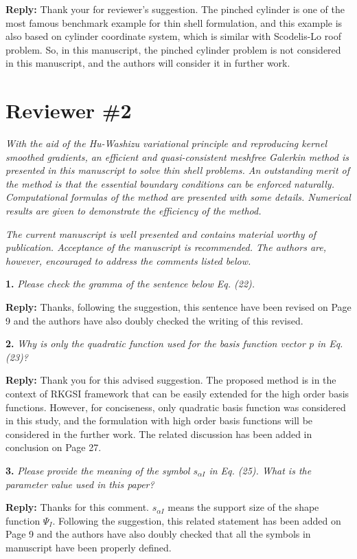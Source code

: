 \documentclass{article}
\begin{document}
\textbf{Reply:} Thank your for reviewer's suggestion. The pinched cylinder is one of the most famous benchmark example for thin shell formulation, and this example is also based on cylinder coordinate system, which is similar with Scodelis-Lo roof problem. So, in this manuscript, the pinched cylinder problem is not considered in this manuscript, and the authors will consider it in further work.

\section*{Reviewer \#2}
\textit{With the aid of the Hu-Washizu variational principle and reproducing kernel smoothed gradients, an efficient and quasi-consistent meshfree Galerkin method is presented in this manuscript to solve thin shell problems. An outstanding merit of the method is that the essential boundary conditions can be enforced naturally. Computational formulas of the method are presented with some details. Numerical results are given to demonstrate the efficiency of the method.}

\textit{The current manuscript is well presented and contains material worthy of publication. Acceptance of the manuscript is recommended. The authors are, however, encouraged to address the comments listed below.}

\textbf{1.} \textit{Please check the gramma of the sentence below Eq. (22).}

\textbf{Reply:} Thanks, following the suggestion, this sentence have been revised on Page 9 and the authors have also doubly checked the writing of this revised.

\textbf{2.} \textit{Why is only the quadratic function used for the basis function vector p in Eq. (23)?}

\textbf{Reply:} Thank you for this advised suggestion. The proposed method is in the context of RKGSI framework that can be easily extended for the high order basis functions. However, for conciseness, only quadratic basis function was considered in this study, and the formulation with high order basis functions will be considered in the further work. The related discussion has been added in conclusion on Page 27.

\textbf{3.} \textit{Please provide the meaning of the symbol $s_{\alpha I}$ in Eq. (25). What is the parameter value used in this paper?}

\textbf{Reply:} Thanks for this comment. $s_{\alpha I}$ means the support size of the shape function $\Psi_I$. Following the suggestion, this related statement has been added on Page 9 and the authors have also doubly checked that all the symbols in manuscript have been properly defined.
\end{document}
